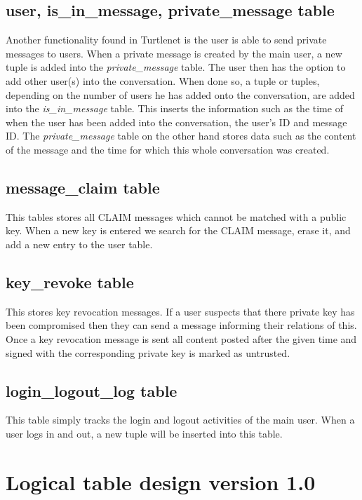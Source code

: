\subsection{user, is\_in\_message, private\_message table}
Another functionality found in Turtlenet is the user is able to send private 
messages to users. When a private message is created by the main user, a new 
tuple is added into the {\it private\_message} table. The user then has the 
option to add other user(s) into the conversation. When done so, a tuple or 
tuples, depending on the number of users he has added onto the conversation, are 
added into the {\it is\_in\_message} table. This inserts the information such as 
the time of when the user has been added into the conversation, the user's ID 
and message ID. The {\it private\_message} table on the other hand stores data 
such as the content of the message and the time for which this whole conversation 
was created. 

\subsection{message\_claim table}
This tables stores all CLAIM messages which cannot be matched with a public key.
When a new key is entered we search for the CLAIM message, erase it, and add a
new entry to the user table.

\subsection{key\_revoke table}
This stores key revocation messages. If a user suspects that there private key
has been compromised then they can send a message informing their relations of
this. Once a key revocation message is sent all content posted after the given
time and signed with the corresponding private key is marked as untrusted.

\subsection{login\_logout\_log table}
This table simply tracks the login and logout activities of the main user. When a 
user logs in and out, a new tuple will be inserted into this table.

\clearpage

\section{Logical table design version 1.0}

